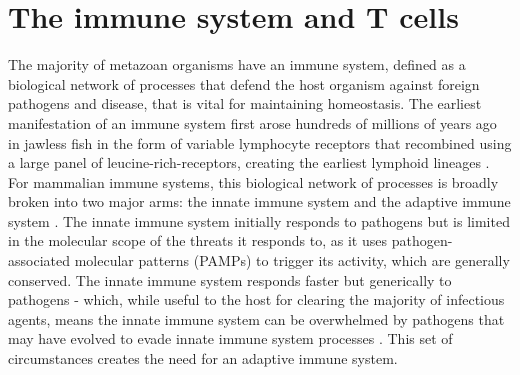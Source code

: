\section{The immune system and T cells}
The majority of metazoan organisms have an immune system, defined as a biological network of processes that defend the host organism against foreign pathogens and disease, that is vital for maintaining homeostasis. The earliest manifestation of an immune system first arose hundreds of millions of years ago in jawless fish in the form of variable lymphocyte receptors that recombined using a large panel of leucine-rich-receptors, creating the earliest lymphoid lineages \cite{Flajnik2010}. For mammalian immune systems, this biological network of processes is broadly broken into two major arms: the innate immune system and the adaptive immune system \cite{Dempsey2003}. The innate immune system initially responds to pathogens but is limited in the molecular scope of the threats it responds to, as it uses pathogen-associated molecular patterns (PAMPs) to trigger its activity, which are generally conserved. The innate immune system responds faster but generically to pathogens - which, while useful to the host for clearing the majority of infectious agents, means the innate immune system can be overwhelmed by pathogens that may have evolved to evade innate immune system processes \cite{Dempsey2003}. This set of circumstances creates the need for an adaptive immune system. 

